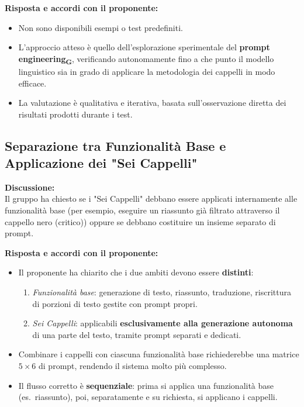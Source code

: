 \vspace{0.3cm}
\textbf{Risposta e accordi con il proponente:}
\begin{itemize}[leftmargin=1.5em, itemsep=3pt]
    \item Non sono disponibili esempi o test predefiniti.
    \item L'approccio atteso è quello dell'esplorazione sperimentale del \textbf{prompt engineering\textsubscript{G}}, verificando autonomamente fino a che punto il modello linguistico sia in grado di applicare la metodologia dei cappelli in modo efficace.
    \item La valutazione è qualitativa e iterativa, basata sull'osservazione diretta dei risultati prodotti durante i test.
\end{itemize}

\vspace{0.4cm}

\subsection{Separazione tra Funzionalità Base e Applicazione dei "Sei Cappelli"}

\textbf{Discussione:}\\
Il gruppo ha chiesto se i "Sei Cappelli" debbano essere applicati internamente alle funzionalità base (per esempio, eseguire un riassunto già filtrato attraverso il cappello nero (critico)) oppure se debbano costituire un insieme separato di prompt.

\vspace{0.3cm}
\textbf{Risposta e accordi con il proponente:}
\begin{itemize}[leftmargin=1.5em, itemsep=3pt]
    \item Il proponente ha chiarito che i due ambiti devono essere \textbf{distinti}:
    \begin{enumerate}[leftmargin=1.8em, itemsep=2pt]
        \item \textit{Funzionalità base}: generazione di testo, riassunto, traduzione, riscrittura di porzioni di testo gestite con prompt propri.
        \item \textit{Sei Cappelli}: applicabili \textbf{esclusivamente alla generazione autonoma} di una parte del testo, tramite prompt separati e dedicati.
    \end{enumerate}
    \item Combinare i cappelli con ciascuna funzionalità base richiederebbe una matrice $5 \times 6$ di prompt, rendendo il sistema molto più complesso.
    \item Il flusso corretto è \textbf{sequenziale}: prima si applica una funzionalità base (es.\ riassunto), poi, separatamente e su richiesta, si applicano i cappelli.
\end{itemize}

